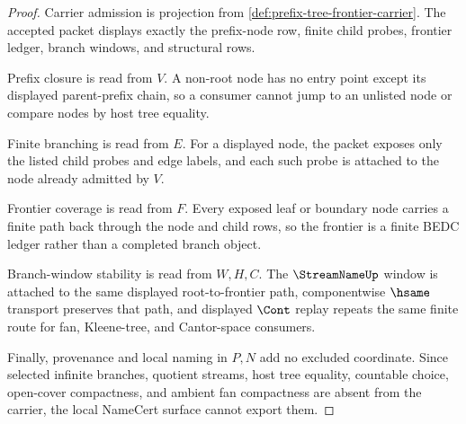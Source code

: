 \begin{proof}
Carrier admission is projection from \autoref{def:prefix-tree-frontier-carrier}. The accepted packet displays exactly the prefix-node row, finite child probes, frontier ledger, branch windows, and structural rows.

Prefix closure is read from $V$. A non-root node has no entry point except its displayed parent-prefix chain, so a consumer cannot jump to an unlisted node or compare nodes by host tree equality.

Finite branching is read from $E$. For a displayed node, the packet exposes only the listed child probes and edge labels, and each such probe is attached to the node already admitted by $V$.

Frontier coverage is read from $F$. Every exposed leaf or boundary node carries a finite path back through the node and child rows, so the frontier is a finite BEDC ledger rather than a completed branch object.

Branch-window stability is read from $W,H,C$. The $\StreamNameUp$ window is attached to the same displayed root-to-frontier path, componentwise $\hsame$ transport preserves that path, and displayed $\Cont$ replay repeats the same finite route for fan, Kleene-tree, and Cantor-space consumers.

Finally, provenance and local naming in $P,N$ add no excluded coordinate. Since selected infinite branches, quotient streams, host tree equality, countable choice, open-cover compactness, and ambient fan compactness are absent from the carrier, the local NameCert surface cannot export them.
\end{proof}


\begin{closurestatus}{\PrefixTreeUp}
  \theoryclosure{\seedClosure}
  \formalstatus{\unformalizedV}
\end{closurestatus}
